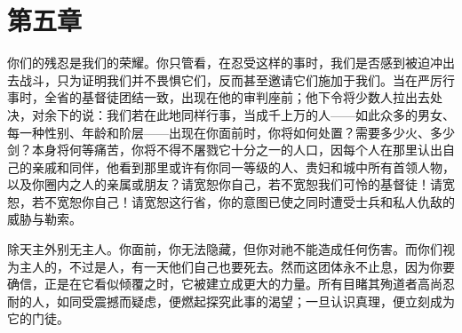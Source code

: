 \section{第五章}

你们的残忍是我们的荣耀。你只管看，在忍受这样的事时，我们是否感到被迫冲出去战斗，只为证明我们并不畏惧它们，反而甚至邀请它们施加于我们。当在严厉行事时，全省的基督徒团结一致，出现在他的审判座前；他下令将少数人拉出去处决，对余下的说：我们若在此地同样行事，当成千上万的人——如此众多的男女、每一种性别、年龄和阶层——出现在你面前时，你将如何处置？需要多少火、多少剑？本身将何等痛苦，你将不得不屠戮它十分之一的人口，因每个人在那里认出自己的亲戚和同伴，他看到那里或许有你同一等级的人、贵妇和城中所有首领人物，以及你圈内之人的亲属或朋友？请宽恕你自己，若不宽恕我们可怜的基督徒！请宽恕，若不宽恕你自己！请宽恕这行省，你的意图已使之同时遭受士兵和私人仇敌的威胁与勒索。\par

除天主外别无主人。你面前，你无法隐藏，但你对祂不能造成任何伤害。而你们视为主人的，不过是人，有一天他们自己也要死去。然而这团体永不止息，因为你要确信，正是在它看似倾覆之时，它被建立成更大的力量。所有目睹其殉道者高尚忍耐的人，如同受震撼而疑虑，便燃起探究此事的渴望；一旦认识真理，便立刻成为它的门徒。\par

